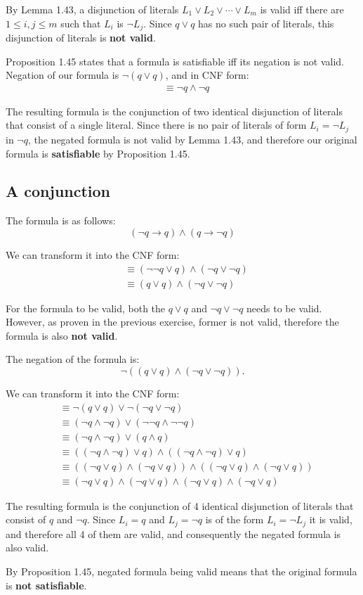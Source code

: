 \documentclass{article}
\newcommand{\imp}{\ensuremath{\rightarrow}}
\newcommand{\fneg}[1]{\ensuremath{\neg \left( #1 \right)}}
\newcommand{\fland}[2]{\ensuremath{\left( #1 \right) \land \left( #2 \right)}}
\newcommand{\flor}[2]{\ensuremath{\left( #1 \right) \lor \left( #2 \right)}}
\newcommand{\FlanD}[2]{\ensuremath{#1 \land #2}}
\newcommand{\FloR}[2]{\ensuremath{#1 \lor #2}}
\newcommand{\floR}[2]{\ensuremath{\left( #1 \right) \lor #2}}
\begin{document}
By Lemma 1.43, a disjunction of literals
$L_1 \lor L_2 \lor \dotsb \lor L_m$ is valid iff there are
$1 \leq i, j \leq m$ such that $L_i$ is $\neg L_j$.
Since $q \lor q$ has no such pair of literals,
this disjunction of literals is \textbf{not valid}.

Proposition 1.45 states that a formula is satisfiable iff
its negation is not valid. Negation of our formula is
$\fneg{q \lor q}$, and in CNF form:
\begin{align*}
&\equiv \neg q \land \neg q
\end{align*}

The resulting formula is the conjunction of two identical
disjunction of literals that consist of a single literal.
Since there is no pair of literals of form $L_i = \neg L_j$ in
$\neg q$, the negated formula is not valid by Lemma 1.43, and therefore
our original formula is \textbf{satisfiable} by Proposition 1.45.

\subsection{A conjunction}
The formula is as follows:
$$
\fland{\neg q \imp q}{q \imp \neg q}
$$

We can transform it into the CNF form:
\begin{align*}
&\equiv \fland{\neg\neg q \lor q}{\neg q \lor \neg q}\\
&\equiv \fland{q \lor q}{\neg q \lor \neg q}
\end{align*}

For the formula to be valid, both the $q \lor q$ and
$\neg q \lor \neg q$ needs to be valid. However, as proven in
the previous exercise, former is not valid, therefore the
formula is also \textbf{not valid}.

The negation of the formula is:
$$
\fneg{\fland{q \lor q}{\neg q \lor \neg q}}.
$$

We can transform it into the CNF form:
\begin{align*}
&\equiv \FloR{\fneg{q \lor q}}{\fneg{\neg q \lor \neg q}}\\
&\equiv \flor{\neg q \land \neg q}{\neg\neg q \land \neg\neg q}\\
&\equiv \flor{\neg q \land \neg q}{q \land q}\\
&\equiv \fland{\floR{\neg q \land \neg q}{q}}{\floR{\neg q \land \neg q}{q}}\\
&\equiv \fland{\fland{\neg q \lor q}{\neg q \lor q}}{\fland{\neg q \lor q}{\neg q \lor q}}\\
&\equiv \FlanD{\fland{\neg q \lor q}{\neg q \lor q}}{\fland{\neg q \lor q}{\neg q \lor q}}
\end{align*}

The resulting formula is the conjunction of 4 identical
disjunction of literals that consist of $q$ and $\neg q$.
Since $L_i = q$ and $L_j = \neg q$ is of the form $L_i = \neg L_j$
it is valid, and therefore all 4 of them are valid, and consequently
the negated formula is also valid.

By Proposition 1.45, negated formula being valid means that
the original formula is \textbf{not satisfiable}.
\end{document}
